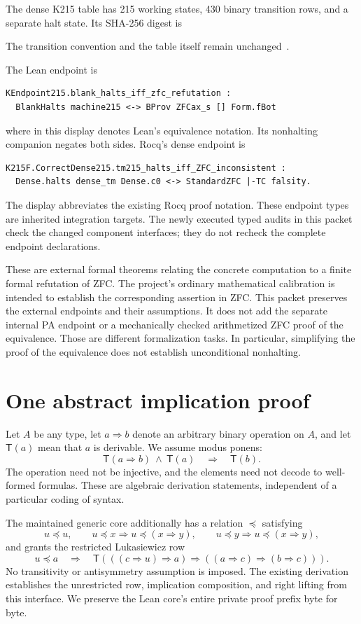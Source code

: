 \documentclass[11pt,letterpaper]{article}
\newcommand{\Prov}[1]{\mathsf{T}(#1)}
\newcommand{\Imp}{\mathbin{\Rightarrow}}
\newcommand{\code}[1]{\texttt{\small\detokenize{#1}}}
\begin{document}
The dense K215 table has 215 working states, 430 binary transition rows, and a
separate halt state. Its SHA-256 digest is
\begin{quote}\small\ttfamily\DenseHash\end{quote}
The transition convention and the table itself remain unchanged~\cite{machine}.

The Lean endpoint is
\begin{lstlisting}
KEndpoint215.blank_halts_iff_zfc_refutation :
  BlankHalts machine215 <-> BProv ZFCax_s [] Form.fBot
\end{lstlisting}
where \code{<->} in this display denotes Lean's equivalence notation. Its
nonhalting companion negates both sides. Rocq's dense endpoint is
\begin{lstlisting}
K215F.CorrectDense215.tm215_halts_iff_ZFC_inconsistent :
  Dense.halts dense_tm Dense.c0 <-> StandardZFC |-TC falsity.
\end{lstlisting}
The display abbreviates the existing Rocq proof notation. These endpoint types
are inherited integration targets. The newly executed typed audits in this
packet check the changed component interfaces; they do not recheck the complete
endpoint declarations.

These are external formal theorems relating the concrete computation to a finite
formal refutation of ZFC. The project's ordinary mathematical calibration is
intended to establish the corresponding assertion in ZFC. This packet preserves
the external endpoints and their assumptions. It does not add the separate
internal PA endpoint or a mechanically checked arithmetized ZFC proof of the
equivalence. Those are different formalization tasks. In particular, simplifying
the proof of the equivalence does not establish unconditional nonhalting.

\section{One abstract implication proof}

Let $A$ be any type, let $a\Imp b$ denote an arbitrary binary operation on $A$,
and let $\Prov a$ mean that $a$ is derivable. We assume modus ponens:
\[
\Prov{a\Imp b}\ \land\ \Prov a\quad\Longrightarrow\quad\Prov b.
\]
The operation need not be injective, and the elements need not decode to
well-formed formulas. These are algebraic derivation statements, independent
of a particular coding of syntax.

The maintained generic core additionally has a relation $\preceq$ satisfying
\[
u\preceq u,\qquad
u\preceq x\Longrightarrow u\preceq(x\Imp y),\qquad
u\preceq y\Longrightarrow u\preceq(x\Imp y),
\]
and grants the restricted Lukasiewicz row
\begin{equation}\label{eq:rho}
u\preceq a\quad\Longrightarrow\quad
\Prov{((c\Imp u)\Imp a)\Imp((a\Imp c)\Imp(b\Imp c))}.
\end{equation}
No transitivity or antisymmetry assumption is imposed. The existing derivation
establishes the unrestricted row, implication composition, and right lifting
from this interface. We preserve the Lean core's entire private proof prefix
byte for byte.
\end{document}
